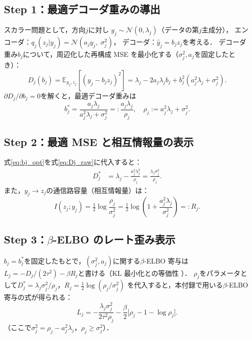 \documentclass[11pt,a4paper]{jsarticle}
\begin{document}
\subsection*{Step 1：最適デコーダ重みの導出}

スカラー問題として，方向$j$に対し
$y_j \sim \mathcal{N}(0, \lambda_j)$（データの第$j$主成分），
エンコーダ：$q_j(z_j | y_j) = \mathcal{N}(a_j y_j,\; \sigma_j^2)$，
デコーダ：$\hat{y}_j = b_j z_j$を考える．
デコーダ重み$b_j$について，周辺化した再構成 MSE を最小化する（$\sigma_j^2, a_j$を固定したとき）：
\begin{equation}
  D_j(b_j) = \mathbb{E}_{y_j, z_j}[(y_j - b_j z_j)^2]
  = \lambda_j - 2 a_j \lambda_j b_j + b_j^2 (a_j^2 \lambda_j + \sigma_j^2).
  \label{eq:Dj_raw}
\end{equation}
$\partial D_j / \partial b_j = 0$を解くと，最適デコーダ重みは
\begin{equation}
  b_j^* = \frac{a_j \lambda_j}{a_j^2 \lambda_j + \sigma_j^2}
         =: \frac{a_j \lambda_j}{\rho_j},
  \quad \rho_j := a_j^2 \lambda_j + \sigma_j^2.
  \label{eq:bj_opt}
\end{equation}

\subsection*{Step 2：最適 MSE と相互情報量の表示}

式\eqref{eq:bj_opt}を式\eqref{eq:Dj_raw}に代入すると：
\begin{align}
  D_j^* &= \lambda_j - \frac{a_j^2 \lambda_j^2}{\rho_j}
          = \frac{\lambda_j \sigma_j^2}{\rho_j}.
  \label{eq:Dj_opt}
\end{align}
また，$y_j \to z_j$の通信路容量（相互情報量）は：
\begin{equation}
  I(z_j; y_j) = \tfrac{1}{2}\log\frac{\rho_j}{\sigma_j^2}
              = \tfrac{1}{2}\log\!\left(1 + \frac{a_j^2 \lambda_j}{\sigma_j^2}\right)
              =: R_j.
  \label{eq:Rj}
\end{equation}

\subsection*{Step 3：$\beta$-ELBO のレート歪み表示}

$b_j = b_j^*$を固定したもとで，$(\sigma_j^2, a_j)$に関する$\beta$-ELBO 寄与は
$L_j = -D_j/(2\tau^2) - \beta R_j$と書ける（KL 最小化との等価性 \cite{cover2006elements}）．
$\rho_j$をパラメータとして$D_j^* = \lambda_j \sigma_j^2/\rho_j$，$R_j = \tfrac{1}{2}\log(\rho_j/\sigma_j^2)$
を代入すると，本付録で用いる$\beta$-ELBO 寄与の式が得られる：
\begin{equation}
  L_j = -\frac{\lambda_j \sigma_j^2}{2\tau^2 \rho_j}
        - \frac{\beta}{2}\bigl[\rho_j - 1 - \log \rho_j\bigr].
  \label{eq:elbo_j}
\end{equation}
（ここで$\sigma_j^2 = \rho_j - a_j^2\lambda_j$，$\rho_j \geq \sigma_j^2$）．
\end{document}
